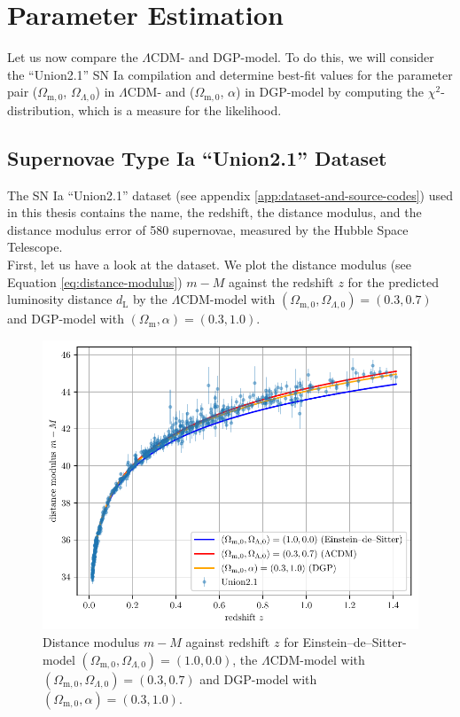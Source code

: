\chapter{Parameter Estimation}
\label{chap:parameter-estimation}
\thispagestyle{empty}

Let us now compare the $\Lambda$CDM- and DGP-model. To do this, we will consider the ``Union2.1'' SN Ia compilation and determine best-fit values for the parameter pair ($\Omega_{\text{m},0}$, $\Omega_{\Lambda,0}$) in $\Lambda$CDM- and ($\Omega_{\text{m},0}$, $\alpha$) in DGP-model by computing the $\chi^2$-distribution, which is a measure for the likelihood.

\section{Supernovae Type Ia ``Union2.1'' Dataset}

\noindent The SN Ia ``Union2.1'' dataset (see appendix \ref{app:dataset-and-source-codes}) used in this thesis contains the name, the redshift, the distance modulus, and the distance modulus error of 580 supernovae, measured by the Hubble Space Telescope. \\

\noindent First, let us have a look at the dataset. We plot the distance modulus (see Equation \eqref{eq:distance-modulus}) $m - M$ against the redshift $z$ for the predicted luminosity distance $d_{\text{L}}$ by the $\Lambda$CDM-model with $(\Omega_{\text{m},0}, \Omega_{\Lambda,0}) = (0.3, 0.7)$ and DGP-model with $(\Omega_{\text{m}}, \alpha)=(0.3, 1.0)$.

\begin{figure}[H]
   \centering
   \includegraphics[scale=0.97]{figures/plots/PDF/redshift-vs-distance-modulus.pdf}
   \caption{Distance modulus $m - M$ against redshift $z$ for Einstein--de--Sitter-model $(\Omega_{\text{m},0}, \Omega_{\Lambda,0}) = (1.0, 0.0)$, the $\Lambda$CDM-model with $(\Omega_{\text{m},0}, \Omega_{\Lambda,0}) = (0.3, 0.7)$ and DGP-model with $(\Omega_{\text{m},0}, \alpha) = (0.3, 1.0)$.\\}
   \label{fig:redshift-vs-distance-modulus}
\end{figure}

